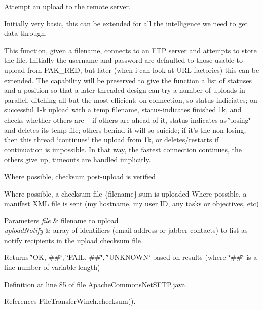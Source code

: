 Attempt an upload to the remote server. 

Initially very basic, this can be extended for all the intelligence we need to get data through.

This function, given a filename, connects to an F\-T\-P server and attempts to store the file. Initially the username and password are defaulted to those usable to upload from P\-A\-K\-\_\-\-R\-E\-D, but later (when i can look at U\-R\-L factories) this can be extended. The capability will be preserved to give the function a list of statuses and a position so that a later threaded design can try a number of uploads in parallel, ditching all but the most efficient\-: on connection, so status-\/indiciates; on successful 1-\/k upload with a temp filename, status-\/indicates finished 1k, and checks whether others are -- if others are ahead of it, status-\/indicates as \char`\"{}losing\char`\"{} and deletes its temp file; others behind it will so-\/suicide; if it's the non-\/losing, then this thread \char`\"{}continues\char`\"{} the upload from 1k, or deletes/restarts if continuation is impossible. In that way, the fastest connection continues, the others give up, timeouts are handled implicitly.

Where possible, checksum post-\/upload is verified

Where possible, a checksum file \{filename\}.sum is uploaded Where possible, a manifest X\-M\-L file is sent (my hostname, my user I\-D, any tasks or objectives, etc)


\begin{DoxyParams}{Parameters}
{\em file} & filename to upload \\
\hline
{\em upload\-Notify} & array of identifiers (email address or jabber contacts) to list as notify recipients in the upload checksum file \\
\hline
\end{DoxyParams}
\begin{DoxyReturn}{Returns}
\char`\"{}\-O\-K, \#\#\char`\"{}, \char`\"{}\-F\-A\-I\-L, \#\#\char`\"{}, \char`\"{}\-U\-N\-K\-N\-O\-W\-N\char`\"{} based on results (where \char`\"{}\#\#\char`\"{} is a line number of variable length) 
\end{DoxyReturn}


Definition at line 85 of file Apache\-Commons\-Net\-S\-F\-T\-P.\-java.



References File\-Transfer\-Winch.\-checksum().



